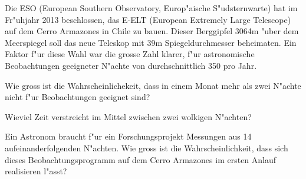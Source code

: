 Die ESO (European Southern Observatory, Europ"aische S"udsternwarte)
hat im Fr"uhjahr 2013 beschlossen,
das E-ELT (European Extremely Large Telescope) auf dem
Cerro Armazones in Chile zu bauen.
Dieser Berggipfel 3064m "uber dem Meerspiegel soll das neue Teleskop
mit 39m Spiegeldurchmesser beheimaten.
Ein Faktor f"ur diese Wahl war die grosse Zahl klarer, f"ur astronomische
Beobachtungen geeigneter N"achte von durchschnittlich 350 pro Jahr.
\begin{teilaufgaben}
\item Wie gross ist die Wahrscheinlichekeit,
dass in einem Monat mehr als zwei N"achte
nicht f"ur Beobachtungen geeignet sind?
\item Wieviel Zeit verstreicht im Mittel zwischen zwei wolkigen N"achten?
\item Ein Astronom braucht f"ur ein Forschungsprojekt Messungen aus
14 aufeinanderfolgenden N"achten. Wie gross ist die Wahrscheinlichkeit,
dass sich dieses Beobachtungsprogramm auf dem Cerro Armazones
im ersten Anlauf realisieren l"asst?
\end{teilaufgaben}

